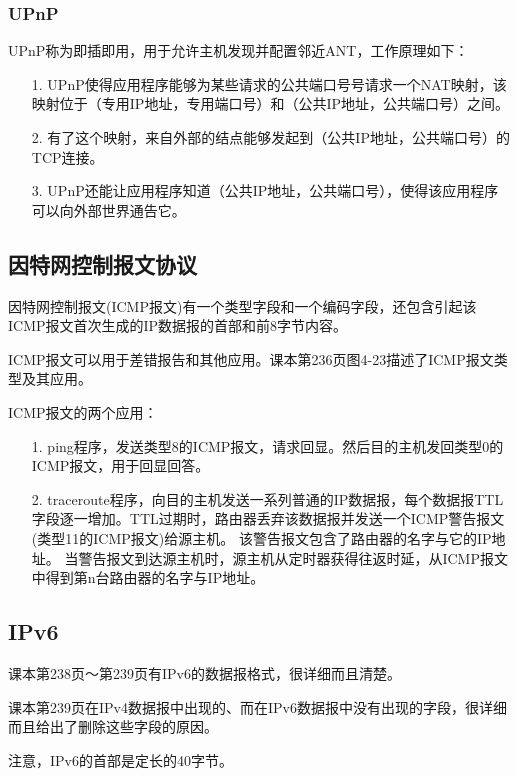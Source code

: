 \documentclass[a4paper,left=2.5cm,right=2.5cm,11pt]{article}
\begin{document}
\subsubsection{UPnP}
	UPnP称为即插即用，用于允许主机发现并配置邻近ANT，工作原理如下：
	\begin{itemize}
		\item[1.] UPnP使得应用程序能够为某些请求的公共端口号号请求一个NAT映射，该映射位于（专用IP地址，专用端口号）和（公共IP地址，公共端口号）之间。
		\item[2.] 有了这个映射，来自外部的结点能够发起到（公共IP地址，公共端口号）的TCP连接。
		\item[3.] UPnP还能让应用程序知道（公共IP地址，公共端口号），使得该应用程序可以向外部世界通告它。
	\end{itemize}

\subsection{因特网控制报文协议}
	因特网控制报文(ICMP报文)有一个类型字段和一个编码字段，还包含引起该ICMP报文首次生成的IP数据报的首部和前8字节内容。\par

	ICMP报文可以用于差错报告和其他应用。课本第236页图4-23描述了ICMP报文类型及其应用。\par

	ICMP报文的两个应用：
	\begin{itemize}
		\item[1.] ping程序，发送类型8的ICMP报文，请求回显。然后目的主机发回类型0的ICMP报文，用于回显回答。
		\item[2.] traceroute程序，向目的主机发送一系列普通的IP数据报，每个数据报TTL字段逐一增加。TTL过期时，路由器丢弃该数据报并发送一个ICMP警告报文(类型11的ICMP报文)给源主机。
				  该警告报文包含了路由器的名字与它的IP地址。
				  当警告报文到达源主机时，源主机从定时器获得往返时延，从ICMP报文中得到第n台路由器的名字与IP地址。
	\end{itemize}

\subsection{IPv6}
	课本第238页～第239页有IPv6的数据报格式，很详细而且清楚。\par

	课本第239页在IPv4数据报中出现的、而在IPv6数据报中没有出现的字段，很详细而且给出了删除这些字段的原因。\par

	注意，IPv6的首部是定长的40字节。
\end{document}
